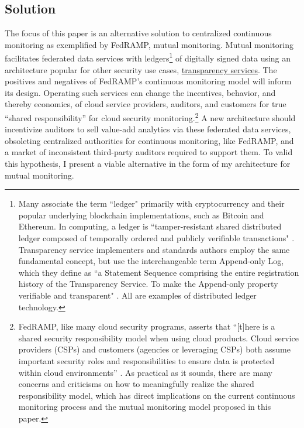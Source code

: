 \documentclass{jdf}
\begin{document}
\subsection{Solution}

The focus of this paper is an alternative solution to centralized continuous monitoring as exemplified by FedRAMP, mutual monitoring. Mutual monitoring facilitates federated data services with ledgers\footnote{Many associate the term ``ledger" primarily with cryptocurrency and their popular underlying blockchain implementations, such as Bitcoin and Ethereum. In computing, a ledger is ``tamper-resistant shared distributed ledger composed of temporally ordered and publicly verifiable transactions" \cite{bashir22}. Transparency service implementers and standards authors employ the same fundamental concept, but use the interchangeable term Append-only Log, which they define as ``a Statement Sequence comprising the entire registration history of the Transparency Service. To make the Append-only property verifiable and transparent" \cite{scitt25}. All are examples of distributed ledger technology.} of digitally signed data using an architecture popular for other security use cases, \href{https://transparency.dev}{transparency services}. The positives and negatives of FedRAMP's continuous monitoring model will inform its design. Operating such services can change the incentives, behavior, and thereby economics, of cloud service providers, auditors, and customers for true ``shared responsibility'' for cloud security monitoring.\footnote{FedRAMP, like many cloud security programs, asserts that ``[t]here is a shared security responsibility model when using cloud products. Cloud service providers (CSPs) and customers (agencies or leveraging CSPs) both assume important security roles and responsibilities to ensure data is protected within cloud environments'' \citeyear{fedramp_srm25}. As practical as it sounds, there are many concerns and criticisms on how to meaningfully realize the shared responsibility model, which has direct implications on the current continuous monitoring process and the mutual monitoring model proposed in this paper.} A new architecture should incentivize auditors to sell value-add analytics via these federated data services, obsoleting centralized authorities for continuous monitoring, like FedRAMP, and a market of inconsistent third-party auditors required to support them. To valid this hypothesis, I present a viable alternative in the form of my architecture for mutual monitoring.
\end{document}
